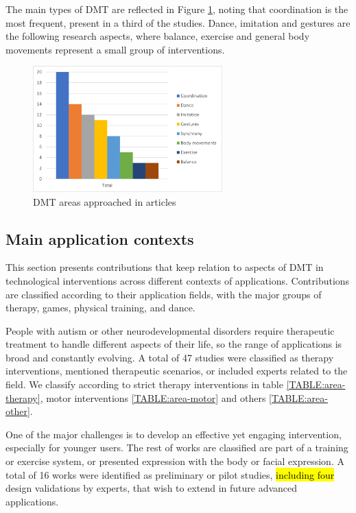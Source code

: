 \documentclass[a4paper,fleqn]{cas-sc}
\begin{document}
The main types of DMT are reflected in Figure \ref{fig:DMT-types}, noting that coordination is the most frequent, present in a third of the studies. Dance, imitation and gestures are the following research aspects, where balance, exercise and general body movements represent a small group of interventions.

\begin{figure}
	\includegraphics[width=0.65\textwidth]{fig5_DMT-types.png}
        \centering
	  \caption{DMT areas approached in articles}
        \label{fig:DMT-types}
\end{figure}

\subsection{Main application contexts}
\label{sec:app-contexts}
This section presents contributions that keep relation to aspects of DMT in technological interventions across different contexts of applications. Contributions are classified according to their application fields, with the major groups of therapy, games, physical training, and dance.

People with autism or other neurodevelopmental disorders require therapeutic treatment to handle different aspects of their life, so the range of applications is broad and constantly evolving. A total of 47 studies were classified as therapy interventions, mentioned therapeutic scenarios, or included experts related to the field. We classify according to strict therapy interventions in table \ref{TABLE:area-therapy}, motor interventions \ref{TABLE:area-motor} and others \ref{TABLE:area-other}.

One of the major challenges is to develop an effective yet engaging intervention, especially for younger users. The rest of works are classified are part of a training or exercise system, or presented expression with the body or facial expression. A total of 16 works were identified as preliminary or pilot studies, \hl{including four} design validations by experts, that wish to extend in future advanced applications.
\end{document}
